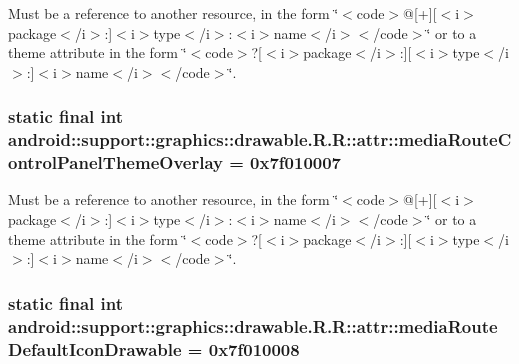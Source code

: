 Must be a reference to another resource, in the form \char`\"{}$<$code$>$@\mbox{[}+\mbox{]}\mbox{[}$<$i$>$package$<$/i$>$:\mbox{]}$<$i$>$type$<$/i$>$:$<$i$>$name$<$/i$>$$<$/code$>$\char`\"{} or to a theme attribute in the form \char`\"{}$<$code$>$?\mbox{[}$<$i$>$package$<$/i$>$:\mbox{]}\mbox{[}$<$i$>$type$<$/i$>$:\mbox{]}$<$i$>$name$<$/i$>$$<$/code$>$\char`\"{}. \hypertarget{classandroid_1_1support_1_1graphics_1_1drawable_1_1_r_1_1attr_09c67d08f32fccc05353386dc9702a58}{
\subsubsection[{mediaRouteControlPanelThemeOverlay}]{\setlength{\rightskip}{0pt plus 5cm}static final int android::support::graphics::drawable.R.R::attr::mediaRouteControlPanelThemeOverlay = 0x7f010007}}
\label{classandroid_1_1support_1_1graphics_1_1drawable_1_1_r_1_1attr_09c67d08f32fccc05353386dc9702a58}


Must be a reference to another resource, in the form \char`\"{}$<$code$>$@\mbox{[}+\mbox{]}\mbox{[}$<$i$>$package$<$/i$>$:\mbox{]}$<$i$>$type$<$/i$>$:$<$i$>$name$<$/i$>$$<$/code$>$\char`\"{} or to a theme attribute in the form \char`\"{}$<$code$>$?\mbox{[}$<$i$>$package$<$/i$>$:\mbox{]}\mbox{[}$<$i$>$type$<$/i$>$:\mbox{]}$<$i$>$name$<$/i$>$$<$/code$>$\char`\"{}. \hypertarget{classandroid_1_1support_1_1graphics_1_1drawable_1_1_r_1_1attr_d29d7ca223348af6756d29faeb3de8bf}{
\subsubsection[{mediaRouteDefaultIconDrawable}]{\setlength{\rightskip}{0pt plus 5cm}static final int android::support::graphics::drawable.R.R::attr::mediaRouteDefaultIconDrawable = 0x7f010008}}
\label{classandroid_1_1support_1_1graphics_1_1drawable_1_1_r_1_1attr_d29d7ca223348af6756d29faeb3de8bf}


